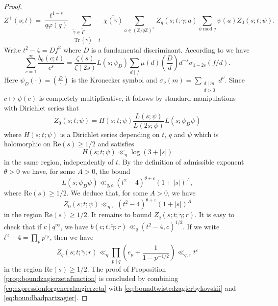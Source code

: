 \documentclass{article}
\theoremstyle{named}
\newcommand{\Z}{\mathbb{Z}}
\DeclareMathOperator{\Tr}{Tr}
\DeclareMathOperator{\modulo}{mod}
\begin{document}
\begin{proof}
\begin{equation}\label{eq:expressionforgeneralzagierzeta}
    Z^+(s; t) = \frac{\ell^{1-s}}{q\varphi(q)}\sum_{\substack{\widetilde{\gamma} \in \widetilde{\Gamma}\\
    \Tr(\widetilde{\gamma}) = t}}\overline{\chi(\widetilde{\gamma})}\sum_{a\in (\Z/q\Z)^\times}Z_q(s; t; \widetilde{\gamma}; a)\sum_{\psi \modulo q} \overline{\psi(a)}Z_0(s; t; \psi).
\end{equation}
Write $t^2 - 4 = Df^2$ where $D$ is a fundamental discriminant. According to \cite[Proposition 3]{zagiermodularformsfouriercoeff} we have
\begin{equation*}
    \sum_{c = 1}^\infty \frac{b_0(c; t)}{c^s} = \frac{\zeta(s)}{\zeta(2s)}L(s; \psi_D)\sum_{d \mid f} \mu(d)\left(\frac{D}{d}\right)d^{-s}\sigma_{1 - 2s}(f/d).
\end{equation*}
Here $\psi_D(\cdot) = \left(\frac{D}{\cdot}\right)$ is the Kronecker symbol and $\sigma_\nu(m) = \sum_{\substack{d \mid m\\d>0}} d^\nu$. Since $c \mapsto \psi(c)$ is completely multiplicative, it follows by standard manipulations with Dirichlet series that
\begin{equation*}
    Z_0(s; t; \psi) = H(s; t; \psi) \frac{L(s; \psi)}{L(2s; \psi)}L(s; \psi_D \psi)
\end{equation*}
where $H(s; t;\psi)$ is a Dirichlet series depending on $t$, $q$ and $\psi$ which is holomorphic on $\text{Re}(s) \geq 1/2$ and satisfies
\begin{equation*}
    H(s; t; \psi) \ll_{q} \log(3 + |s|)
\end{equation*}
in the same region, independently of $t$. By the definition of admissible exponent $\theta > 0$ we have, for some $A> 0$, the bound
\begin{equation*}
    L(s; \psi_D \psi) \ll_{q, \varepsilon} (t^2 - 4)^{\theta + \varepsilon}(1 + |s|)^A,
\end{equation*}
where $\text{Re}(s) \geq 1/2$. We deduce that, for some $A > 0$, we have
\begin{equation}\label{eq:boundtwistedzagierbykovskii}
     Z_0(s; t; \psi) \ll_{q, \varepsilon} (t^2 - 4)^{\theta + \varepsilon} (1 + |s|)^A
\end{equation}
in the region $\text{Re}(s) \geq 1/2$. It remains to bound $Z_q(s; t; \widetilde{\gamma}; r)$. It is easy to check that if $c \mid q^\infty$, we have $b(c; t; \widetilde{\gamma}; r) \ll_q (t^2 - 4, c)^{1/2}$. If we write $t^2 - 4 = \prod_{p} p^{e_p}$, then we have
\begin{equation}\label{eq:boundbadpartzagier}
    Z_q(s; t; \widetilde{\gamma}; r) \ll_q \prod_{p\mid q} \left(e_p  + \frac{1}{1 - p^{-1/2}}\right) \ll_{q, \varepsilon} t^\varepsilon
\end{equation}
in the region $\text{Re}(s) \geq 1/2$. The proof of Proposition \ref{prop:boundzagierzetafunction} is concluded by combining \eqref{eq:expressionforgeneralzagierzeta} with \eqref{eq:boundtwistedzagierbykovskii} and \eqref{eq:boundbadpartzagier}.
\end{proof}
\end{document}
